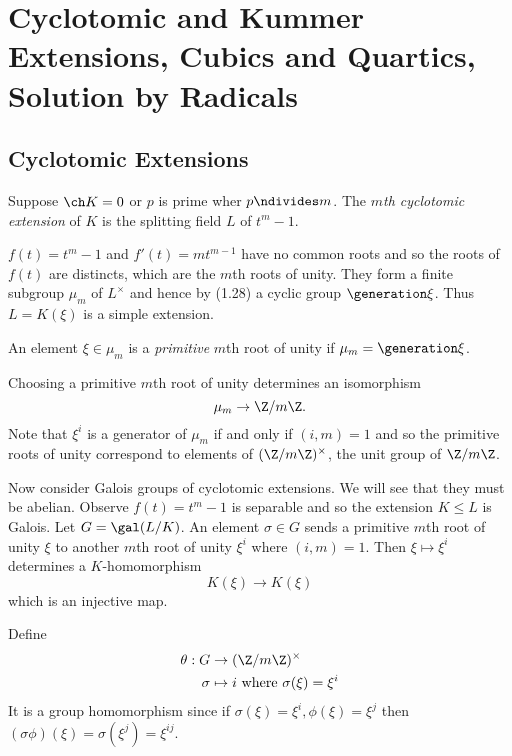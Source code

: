 \documentclass[a4paper]{article}
\begin{document}
\section{Cyclotomic and Kummer Extensions, Cubics and Quartics, Solution by Radicals}

\subsection{Cyclotomic Extensions}

\begin{definition}
  Suppose \(\ch K = 0\) or \(p\) is prime wher \(p \ndivides m\). The \emph{\(m\)th cyclotomic extension} of \(K\) is the splitting field \(L\) of \(t^m - 1\).
\end{definition}

\begin{remark}
  \(f(t) = t^m - 1\) and \(f'(t) = mt^{m - 1}\) have no common roots and so the roots of \(f(t)\) are distincts, which are the \(m\)th roots of unity. They form a finite subgroup \(\mu_m\) of \(L^\times\) and hence by (1.28)  a cyclic group \(\generation \xi\). Thus \(L = K(\xi)\) is a simple extension.
\end{remark}

\begin{definition}
  An element \(\xi \in \mu_m\) is a \emph{primitive} \(m\)th root of unity if \(\mu_m = \generation \xi\).
\end{definition}

Choosing a primitive \(m\)th root of unity determines an isomorphism
\[
  \mu_m \to \Z/m\Z.
\]
Note that \(\xi^i\) is a generator of \(\mu_m\) if and only if \((i, m) = 1\) and so the primitive roots of unity correspond to elements of \((\Z/m\Z)^\times\), the unit group of \(\Z/m\Z\).

Now consider Galois groups of cyclotomic extensions. We will see that they must be abelian. Observe \(f(t) = t^m - 1\) is separable and so the extension \(K \leq L\) is Galois. Let \(G = \gal(L/K)\). An element \(\sigma \in G\) sends a primitive \(m\)th root of unity \(\xi\) to another \(m\)th root of unity \(\xi^i\) where \((i, m) = 1\). Then \(\xi \mapsto \xi^i\) determines a \(K\)-homomorphism
\[
  K(\xi) \to K(\xi)
\]
which is an injective map.

\begin{definition}
  Define
  \begin{align*}
    \theta: G &\to (\Z/m\Z)^\times \\
    \sigma &\mapsto i \text{ where } \sigma(\xi) = \xi^i
  \end{align*}
  It is a group homomorphism since if \(\sigma(\xi) = \xi^i, \phi(\xi) = \xi^j\) then \((\sigma\phi)(\xi) = \sigma(\xi^j) = \xi^{ij}\).
\end{definition}
\end{document}
